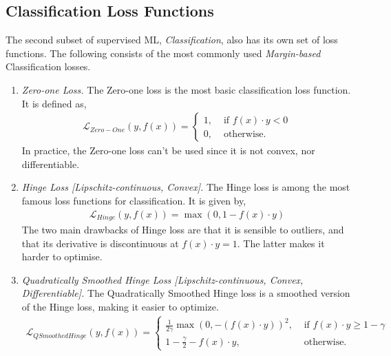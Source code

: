 \documentclass{article}
\begin{document}
\subsection{Classification Loss Functions}%
  \label{sub:Classification Loss Functions}
  The second subset of supervised ML, \textit{Classification}, also has its own set of loss functions. The following consists of the most commonly used \textit{Margin-based} Classification losses. 
  \begin{enumerate}
    \item \textit{Zero-one Loss.} The Zero-one loss is the most basic classification loss function. It is defined as, 
    \begin{equation}
      \begin{split}
        \mathcal{L}_{Zero-One}(y, f(x)) = 
        \begin{cases}
          1, &\text{ if } f(x) \cdot y < 0 \\ 
          0, &\text{ otherwise.} 
        \end{cases}
      \end{split}
    \end{equation}
    In practice, the Zero-one loss can't be used since it is not convex, nor differentiable.
    \item \textit{Hinge Loss [Lipschitz-continuous, Convex].} The Hinge loss is among the most famous loss functions for classification. It is given by, 
 \begin{equation}
      \begin{split}
        \mathcal{L}_{Hinge}(y, f(x)) = \max(0, 1-f(x)\cdot y)
      \end{split}
    \end{equation}
    The two main drawbacks of Hinge loss are that it is sensible to outliers, and that its derivative is discontinuous at $f(x)\cdot y = 1$. The latter makes it harder to optimise.
    \item \textit{Quadratically Smoothed Hinge Loss [Lipschitz-continuous, Convex, Differentiable].} The Quadratically Smoothed Hinge loss is a smoothed version of the Hinge loss, making it easier to optimize.
\begin{equation}
      \begin{split}
        \mathcal{L}_{QSmoothedHinge}(y, f(x)) = 
        \begin{cases}
          \frac{1}{2\gamma} \max(0, -(f(x)\cdot y))^2 , &\text{ if } f(x)\cdot y \geq 1 -\gamma\\
          1 -\frac{\gamma}{2} -f(x)\cdot y, &\text{ otherwise.}  

\end{cases}
\end{split}
\end{equation}
\end{enumerate}
\end{document}
